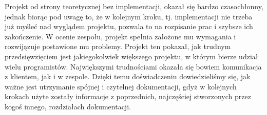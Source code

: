 Projekt od strony teoretycznej bez implementacji, okazał się bardzo czasochłonny, jednak biorąc pod uwagę to, że w kolejnym kroku, tj. implementacji nie trzeba już myśleć nad wyglądem projektu, pozwala to na rozpisanie prac i szybsze ich zakończenie.
W ocenie zespołu, projekt spełnia założone mu wymagania i rozwijązuje postawione mu problemy. Projekt ten pokazał, jak trudnym przedsięwzięciem jest jakiegokolwiek większego projektu, w którym bierze udział wielu programistów. Największymi trudnościami okazała się bowiem komunikacja z klientem, jak i w zespole.
Dzięki temu doświadczeniu dowiedzieliśmy się, jak ważne jest utrzymanie spójnej i czytelnej dokumentacji, gdyż w kolejnych krokach użyte zostały informacje z poprzednich, najczęściej stworzonych przez kogoś innego, rozdziałach dokumentacji.